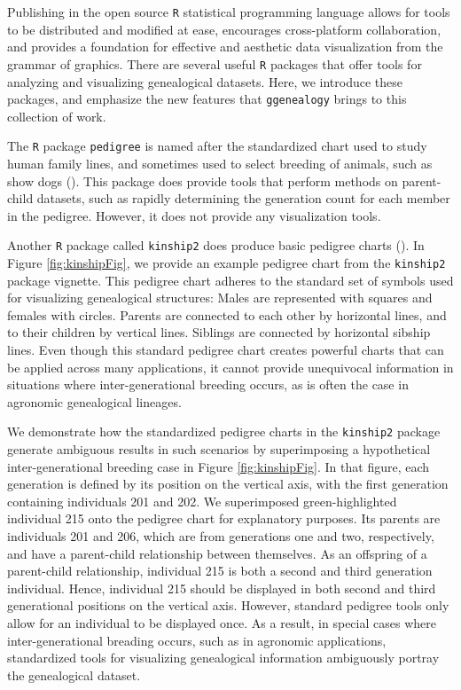 \documentclass[11pt,a4paper,oldfontcommands,openany]{memoir}
\numberwithin{equation}{section} %
\newcommand{\pkg}[1]{{\texttt{#1}}}
\begin{document}
Publishing in the open source \pkg{R} statistical programming language allows for tools to be distributed and modified at ease, encourages cross-platform collaboration, and provides a foundation for effective and aesthetic data visualization from the grammar of graphics. There are several useful \pkg{R} packages that offer tools for analyzing and visualizing genealogical datasets. Here, we introduce these packages, and emphasize the new features that \pkg{ggenealogy} brings to this collection of work.

The \pkg{R} package \pkg{pedigree} is named after the standardized chart used to study human family lines, and sometimes used to select breeding of animals, such as show dogs (\citealt{ped}). This package does provide tools that perform methods on parent-child datasets, such as rapidly determining the generation count for each member in the pedigree. However, it does not provide any visualization tools.

Another \pkg{R} package called \pkg{kinship2} does produce basic pedigree charts (\citealt{kin}). In Figure \ref{fig:kinshipFig}, we provide an example pedigree chart from the \pkg{kinship2} package vignette. This pedigree chart adheres to the standard set of symbols used for visualizing genealogical structures: Males are represented with squares and females with circles. Parents are connected to each other by horizontal lines, and to their children by vertical lines. Siblings are connected by horizontal sibship lines. Even though this standard pedigree chart creates powerful charts that can be applied across many applications, it cannot provide unequivocal information in situations where inter-generational breeding occurs, as is often the case in agronomic genealogical lineages.

We demonstrate how the standardized pedigree charts in the \pkg{kinship2} package generate ambiguous results in such scenarios by superimposing a hypothetical inter-generational breeding case in Figure \ref{fig:kinshipFig}. In that figure, each generation is defined by its position on the vertical axis, with the first generation containing individuals 201 and 202. We superimposed green-highlighted individual 215 onto the pedigree chart for explanatory purposes. Its parents are individuals 201 and 206, which are from generations one and two, respectively, and have a parent-child relationship between themselves. As an offspring of a parent-child relationship, individual 215 is both a second and third generation individual. Hence, individual 215 should be displayed in both second and third generational positions on the vertical axis. However, standard pedigree tools only allow for an individual to be displayed once. As a result, in special cases where inter-generational breading occurs, such as in agronomic applications, standardized tools for visualizing genealogical information ambiguously portray the genealogical dataset.
\end{document}
